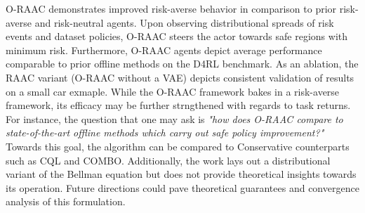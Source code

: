 \documentclass[11pt,letterpaper]{article}
\begin{document}
O-RAAC demonstrates improved risk-averse behavior in comparison to prior risk-averse and risk-neutral agents. Upon observing distributional spreads of risk events and dataset policies, O-RAAC steers the actor towards safe regions with minimum risk. Furthermore, O-RAAC agents depict average performance comparable to prior offline methods on the D4RL benchmark. As an ablation, the RAAC variant (O-RAAC without a VAE) depicts consistent validation of results on a small car exmaple. While the O-RAAC framework bakes in a risk-averse framework, its efficacy may be further strngthened with regards to task returns. For instance, the question that one may ask is \textit{"how does O-RAAC compare to state-of-the-art offline methods which carry out safe policy improvement?"} Towards this goal, the algorithm can be compared to Conservative counterparts such as CQL and COMBO. Additionally, the work lays out a distributional variant of the Bellman equation but does not provide theoretical insights towards its operation. Future directions could pave theoretical guarantees and convergence analysis of this formulation.
\end{document}
